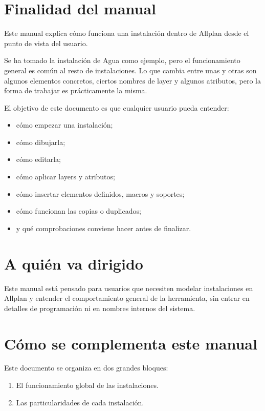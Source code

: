 ﻿\section{Finalidad del manual}

Este manual explica cómo funciona una instalación dentro de Allplan desde el punto de vista del usuario.

Se ha tomado la instalación de Agua como ejemplo, pero el funcionamiento general es común al resto de instalaciones. Lo que cambia entre unas y otras son algunos elementos concretos, ciertos nombres de layer y algunos atributos, pero la forma de trabajar es prácticamente la misma.

El objetivo de este documento es que cualquier usuario pueda entender:

\begin{itemize}
\item cómo empezar una instalación;
\item cómo dibujarla;
\item cómo editarla;
\item cómo aplicar layers y atributos;
\item cómo insertar elementos definidos, macros y soportes;
\item cómo funcionan las copias o duplicados;
\item y qué comprobaciones conviene hacer antes de finalizar.
\end{itemize}

\section{A quién va dirigido}

Este manual está pensado para usuarios que necesiten modelar instalaciones en Allplan y entender el comportamiento general de la herramienta, sin entrar en detalles de programación ni en nombres internos del sistema.

\section{Cómo se complementa este manual}

Este documento se organiza en dos grandes bloques:

\begin{enumerate}
\item El funcionamiento global de las instalaciones.
\item Las particularidades de cada instalación.
\end{enumerate}

